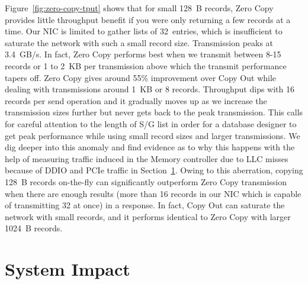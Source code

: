 
Figure~\ref{fig:zero-copy-tput} shows that for small 128~B records, Zero Copy
provides little throughput benefit if you were only returning a few records 
at a time. Our NIC is limited to gather lists
of 32~entries, which is insufficient to saturate the network with such a small
record size. Transmission peaks at 3.4~GB/s. In fact, Zero Copy performs best when
we transmit between 8-15 records or 1 to 2~KB per transmission above which the transmit performance 
tapers off. Zero Copy gives around 55\% improvement over Copy Out while dealing 
with transmissions around 1~KB or 8 records. Throughput dips with 16 records per send operation and it gradually moves up as we 
increase the transmission sizes further but never gets back to the peak transmission. This calls 
for careful attention to the length of S/G list in order for a database designer to get peak performance while using small record sizes and larger 
transmissions. We dig deeper into this anomaly and find evidence as to why this happens with the 
help of measuring traffic induced in the Memory controller due to LLC misses because of DDIO and 
PCIe traffic in Section~\ref{sec:impact}. Owing to this aberration, copying 128~B records 
on-the-fly can significantly outperform Zero Copy transmission when there are 
enough results (more than 16 records in our NIC which is capable of transmitting 32 at once) 
in a response. In fact, Copy Out can saturate the network with small records, and it
performs identical to Zero Copy with larger 1024~B records.


\section{System Impact}
\label{sec:impact}

